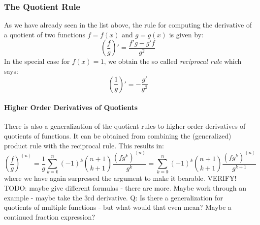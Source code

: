 





\subsubsection{The Quotient Rule} 
As we have already seen in the list above, the rule for computing the derivative of a quotient of two functions $f = f(x)$ and $g = g(x)$ is given by:
\begin{equation}
\left( \frac{f}{g} \right) ' = 
\frac{f' g - g' f}{g^2}
\end{equation}
In the special case for $f(x) = 1$, we obtain the so called \emph{reciprocal rule} which says:
\begin{equation}
\left( \frac{1}{g} \right) ' = 
- \frac{g'}{g^2}
\end{equation}


\paragraph{Higher Order Derivatives of Quotients}
There is also a generalization of the quotient rules to higher order derivatives of quotients of functions. It can be obtained from combining the (generalized) product rule with the reciprocal rule. This results in:
\begin{equation}
\left( \frac{f}{g} \right) ^{(n)} 
= \frac{1}{g} \sum_{k=0}^{n} (-1)^k \binom{n+1}{k+1} \frac{(f g^k)^{(n)}}{g^k}
= \sum_{k=0}^{n} (-1)^k \binom{n+1}{k+1} \frac{(f g^k)^{(n)}}{g^{k+1}}
\end{equation}
where we have again surpressed the argument to make it bearable. VERIFY! TODO: maybe give different formulas - there are more. Maybe work through an example - maybe take the 3rd derivative. Q: Is there a generalization for quotients of multiple functions - but what would that even mean? Maybe a continued fraction expression? 

